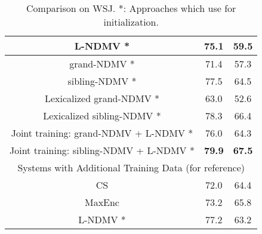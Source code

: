 \documentclass[11pt]{article}
\begin{document}
\begin{table}[tbp]
\begin{tabular}{cccc}
\multicolumn{2}{c|}{L-NDMV * \cite{Han2017DependencyGI}}         & \multicolumn{1}{c|}{75.1}  & 59.5 \\ \hline
\multicolumn{2}{c|}{grand-NDMV *}                              & \multicolumn{1}{c|}{71.4} & 57.3 \\
\multicolumn{2}{c|}{sibling-NDMV *}                              & \multicolumn{1}{c|}{77.5} & 64.5 \\
\multicolumn{2}{c|}{Lexicalized grand-NDMV *} & \multicolumn{1}{c|}{63.0}      &  52.6    \\ 
\multicolumn{2}{c|}{Lexicalized sibling-NDMV *} & \multicolumn{1}{c|}{78.3}      & 66.4     \\ \hline
\multicolumn{2}{c|}{Joint training: grand-NDMV + L-NDMV *}   &
\multicolumn{1}{c|}{76.0}     &   64.3   \\
\multicolumn{2}{c|}{Joint training: sibling-NDMV + L-NDMV *}  &
\multicolumn{1}{c|}{ \textbf{79.9}}     &  \textbf{67.5}    \\ \hline
\multicolumn{4}{c}{Systems with Additional Training Data (for reference)}                                   \\ \hline
\multicolumn{2}{c|}{CS \cite{Spitkovsky2013BreakingOO}}                   & \multicolumn{1}{c|}{72.0}  & 64.4 \\
\multicolumn{2}{c|}{MaxEnc \cite{le-zuidema-2015-unsupervised}}               & \multicolumn{1}{c|}{73.2}  & 65.8 \\
\multicolumn{2}{c|}{L-NDMV * \cite{Han2017DependencyGI}}               & \multicolumn{1}{c|}{77.2}  & 63.2 \\ \hline
\end{tabular}
\caption{ Comparison on WSJ. *: Approaches which use   for initialization.}
\label{wsjresult}
\end{table}
\end{document}
